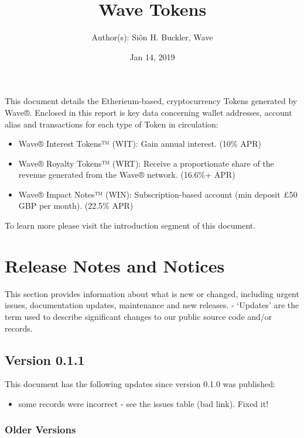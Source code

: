 \documentclass[letterpaper,10pt,english]{sphinxmanual}
\title{Wave Tokens}
\date{Jan 14, 2019}
\author{Author(s): Siôn H. Buckler, Wave}
\begin{document}
\maketitle
\sphinxtableofcontents
{}\label{\detokenize{index::doc}}


This document details the Etherieum-based, cryptocurrency Tokens generated by Wave®.
Enclosed in this report is key data concerning wallet addresses, account alias and transactions for each type of Token in circulation:
\begin{itemize}
\item {} 
Wave® Interest Tokens™ (WIT): Gain annual interest. (10\% APR)

\item {} 
Wave® Royalty Tokens™ (WRT): Receive a proportionate share of the revenue generated from the Wave® network. (16.6\%+ APR)

\item {} 
Wave® Impact Notes™ (WIN): Subscription-based account (min deposit £50 GBP per month). (22.5\% APR)

\end{itemize}

To learn more please visit the introduction segment of this document.


\chapter{Release Notes and Notices}
\label{\detokenize{releasenotes:release-notes-and-notices}}\label{\detokenize{releasenotes::doc}}
This section provides information about what is new or changed, including urgent issues, documentation updates, maintenance and new releases.
- ‘Updates’ are the term used to describe significant changes to our public source code and/or records.


\section{Version 0.1.1}
\label{\detokenize{releasenotes:version-0-1-1}}
This document has the following updates since version 0.1.0 was published:
\begin{itemize}
\item {} 
some records were incorrect - see the issues table (bad link). Fixed it!

\end{itemize}


\subsection{Older Versions}
\label{\detokenize{releasenotes:older-versions}}
\end{document}
